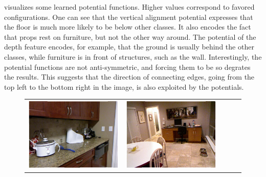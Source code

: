 \documentclass[a4paper, 10pt, conference]{ieeeconf}      %
\begin{document}
 visualizes some learned potential functions.
Higher values correspond to favored configurations. One can see that the
vertical alignment potential expresses that the floor is much more likely to be below
other classes. It also encodes the fact that props
rest on furniture, but not the other way around.
The potential of the depth feature encodes, for example, that the ground
is usually behind the other classes, while furniture is in front of structures,
such as the wall.
Interestingly, the potential functions are not anti-symmetric, and forcing them to be so
degrates the results. This suggests that the direction of connecting edges, going from
the top left to the bottom right in the image, is also exploited by the potentials.


\begin{figure}
    \begin{tabu} to 
    \includegraphics[width=\linewidth]{images/00845_image.png}&%
    \includegraphics[width=\linewidth]{images/00781_image.png}&%

\end{tabu}
\end{figure}
\end{document}
